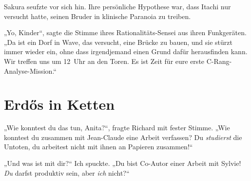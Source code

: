 Sakura seufzte vor sich hin. Ihre persönliche Hypothese war, dass Itachi nur versucht hatte, seinen Bruder in klinische Paranoia zu treiben.

„Yo, Kinder“, sagte die Stimme ihres Rationalitäts-Sensei aus ihren Funkgeräten.
„Da ist ein Dorf in Wave, das versucht, eine Brücke zu bauen, und sie stürzt immer wieder ein, ohne dass irgendjemand einen Grund dafür herausfinden kann. Wir treffen uns um 12~Uhr an den Toren. Es ist Zeit für eure erste C-Rang-Analyse-Mission.“

\section{Erdős in Ketten}

„Wie konntest du das tun, Anita?“, fragte Richard mit fester Stimme.
„Wie konntest du zusammen mit Jean-Claude eine Arbeit verfassen? Du \emph{studierst} die Untoten, du arbeitest nicht mit ihnen an Papieren zusammen!“

„Und was ist mit dir?“ Ich spuckte.
„Du bist Co-Autor einer Arbeit mit Sylvie! \emph{Du} darfst produktiv sein, aber \emph{ich} nicht?“

